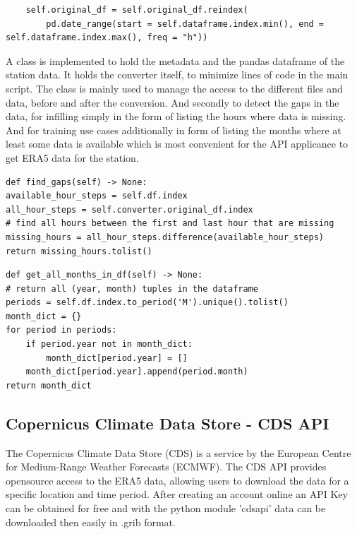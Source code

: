 \begin{lstlisting}
    self.original_df = self.original_df.reindex(
        pd.date_range(start = self.dataframe.index.min(), end = self.dataframe.index.max(), freq = "h"))
\end{lstlisting}

A class  is implemented to hold the metadata and the pandas dataframe of the station data. It holds the converter itself, to minimize lines of code in the main script. The class is mainly used to manage the access to the different files and data, before and after the conversion. And secondly to detect the gaps in the data, for infilling simply in the form of listing the hours where data is missing. And for training use cases additionally in form of listing the months where at least some data is available which is most convenient for the API applicance to get ERA5 data for the station.


\begin{lstlisting}[caption=Gap Detection in Station Class, label=lst:find_gaps]
def find_gaps(self) -> None:
available_hour_steps = self.df.index
all_hour_steps = self.converter.original_df.index
# find all hours between the first and last hour that are missing
missing_hours = all_hour_steps.difference(available_hour_steps)
return missing_hours.tolist()
\end{lstlisting}

\begin{lstlisting}[caption=Detection of available ranges in Station Class, label=lst:available_ranges]
def get_all_months_in_df(self) -> None:
# return all (year, month) tuples in the dataframe
periods = self.df.index.to_period('M').unique().tolist()
month_dict = {}
for period in periods:
    if period.year not in month_dict:
        month_dict[period.year] = []
    month_dict[period.year].append(period.month)
return month_dict
\end{lstlisting}

\subsection{Copernicus Climate Data Store - CDS API}
\label{sec: cds_api}

The Copernicus Climate Data Store (CDS) is a service by the European Centre for Medium-Range Weather Forecasts (ECMWF). The CDS API provides opensource access to the ERA5 data, allowing users to download the data for a specific location and time period. After creating an account online an API Key can be obtained for free and with the python module 'cdsapi' data can be downloaded then easily in .grib format. 

